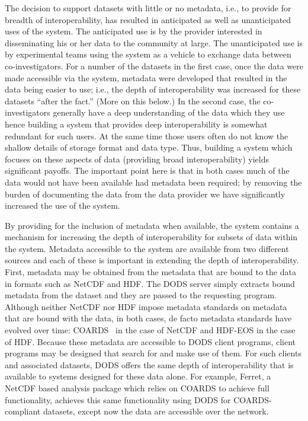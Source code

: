 \documentclass{article}
\begin{document}
The decision to support datasets with little or no metadata, i.e., to provide
for breadth of interoperability, has resulted in anticipated as well as
unanticipated uses of the system. The anticipated use is by the provider
interested in disseminating his or her data to the community at large. The
unanticipated use is by experimental teams using the system as a vehicle to
exchange data between co-investigators. For a number of the datasets in the
first case, once the data were made accessible via the system, metadata were
developed that resulted in the data being easier to use; i.e., the depth of
interoperability was increased for these datasets ``after the fact.'' (More
on this below.) In the second case, the co-investigators generally have a
deep understanding of the data which they use hence building a system that
provides deep interoperability is somewhat redundant for such users. At the
same time those users often do not know the shallow details of storage format
and data type.  Thus, building a system which focuses on these aspects of
data (providing broad interoperability) yields significant payoffs.  The
important point here is that in both cases much of the data would not have
been available had metadata been required; by removing the burden of
documenting the data from the data provider we have significantly increased
the use of the system.

By providing for the inclusion of metadata when available, the system
contains a mechanism for increasing the depth of interoperability for subsets
of data within the system. Metadata accessible to the system are available
from two different sources and each of these is important in extending the
depth of interoperability. First, metadata may be obtained from the metadata
that are bound to the data in formats such as \acs{NetCDF} and \acs{HDF}. The
\ac{DODS} server simply extracts bound metadata from the dataset and they are
passed to the requesting program. Although neither \acs{NetCDF} nor \acs{HDF}
impose metadata standards on metadata that are bound with the data, in both
cases, de facto metadata standards have evolved over time:
\acs{COARDS}~\cite{netcdf:conventions} in the case of \acs{NetCDF} and
\acs{HDF}-\acs{EOS} in the case of \acs{HDF}. Because these metadata are
accessible to \ac{DODS} client programs, client programs may be designed that
search for and make use of them. For such clients and associated datasets,
\ac{DODS} offers the same depth of interoperability that is available to
systems designed for these data alone.  For example, Ferret, a \acs{NetCDF}
based analysis package which relies on \acs{COARDS} to achieve full
functionality, achieves this same functionality using \ac{DODS} for
\acs{COARDS}-compliant datasets, except now the data are accessible over the
network.
\end{document}
